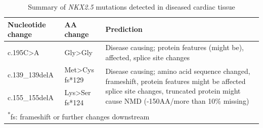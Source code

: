 \begin{refsection}
\begin{table}[!tb]
\centering
\caption[Summary of \textit{NKX2.5} mutations detected in diseased cardiac tissue]{Summary of \textit{NKX2.5} mutations detected in diseased cardiac tissue}
\label{tab:5_5}
\begin{tabular}{  p{1.25in} p{0.75in} p{3in} }
\toprule
	\textbf{Nucleotide change} & \textbf{AA change} & \textbf{Prediction} \\ \toprule
	c.195C>A & Gly>Gly & Disease causing; protein features (might be), affected, splice site changes \\ \midrule
	c.139\_139delA & Met>Cys fs*129 & \multirow{2}{3in}{Disease causing; amino acid sequence changed, frameshift, protein features might be affected splice site changes, truncated protein might cause NMD (-150AA/more than 10\% missing)} \\ 
	c.155\_155delA & Lys>Ser  fs*124 &  \\ \bottomrule
\multicolumn{3}{l}{\textsuperscript{*}\footnotesize{fs: frameshift or further changes downstream}}\\
\end{tabular}
\end{table}


\end{refsection}
